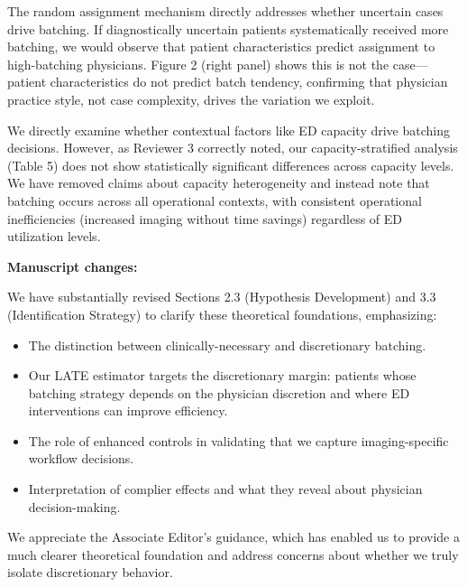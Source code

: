 \documentclass[11pt]{article}
\newcommand{\1}{\hbox{\rm 1\kern-.35em 1}}
\begin{document}
The random assignment mechanism directly addresses whether uncertain cases drive batching. If diagnostically uncertain patients systematically received more batching, we would observe that patient characteristics predict assignment to high-batching physicians. Figure 2 (right panel) shows this is not the case—patient characteristics do not predict batch tendency, confirming that physician practice style, not case complexity, drives the variation we exploit.

We directly examine whether contextual factors like ED capacity drive batching decisions. However, as Reviewer 3 correctly noted, our capacity-stratified analysis (Table 5) does not show statistically significant differences across capacity levels. We have removed claims about capacity heterogeneity and instead note that batching occurs across all operational contexts, with consistent operational inefficiencies (increased imaging without time savings) regardless of ED utilization levels.

\textbf{Manuscript changes:}

We have substantially revised Sections 2.3 (Hypothesis Development) and 3.3 (Identification Strategy) to clarify these theoretical foundations, emphasizing:

\begin{itemize}
\item The distinction between clinically-necessary and discretionary batching.
\item Our LATE estimator targets the discretionary margin: patients whose batching strategy depends on the physician discretion and where ED interventions can improve efficiency.
\item The role of enhanced controls in validating that we capture imaging-specific workflow decisions.
\item Interpretation of complier effects and what they reveal about physician decision-making.
\end{itemize}

We appreciate the Associate Editor's guidance, which has enabled us to provide a much clearer theoretical foundation and address concerns about whether we truly isolate discretionary behavior.
\color{black}
\end{document}
